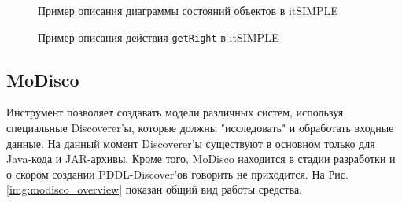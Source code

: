 \documentclass[a4paper,14pt]{extreport}
\begin{document}
    \begin{figure}[h] 
        \caption{Пример описания диаграммы состояний объектов в itSIMPLE}
        \label{img:its_phil_states}

    \end{figure}
    
    \begin{figure}[h] 
        \caption{Пример описания действия \texttt{getRight} в itSIMPLE}
        \label{img:its_phil_precond}

    \end{figure}
        
    
\subsection*{MoDisco}
    Инструмент позволяет создавать модели различных систем, используя специальные Discoverer'ы, которые должны "исследовать" и обработать входные данные.
 На данный момент   Discoverer'ы существуют в основном только для Java-кода и JAR-архивы.
 Кроме того, MoDisco находится в стадии разработки и о скором создании PDDL-Discover'ов говорить не приходится.
 На  Рис. \ref{img:modisco_overview} показан общий вид работы средства.
    
\end{document}
